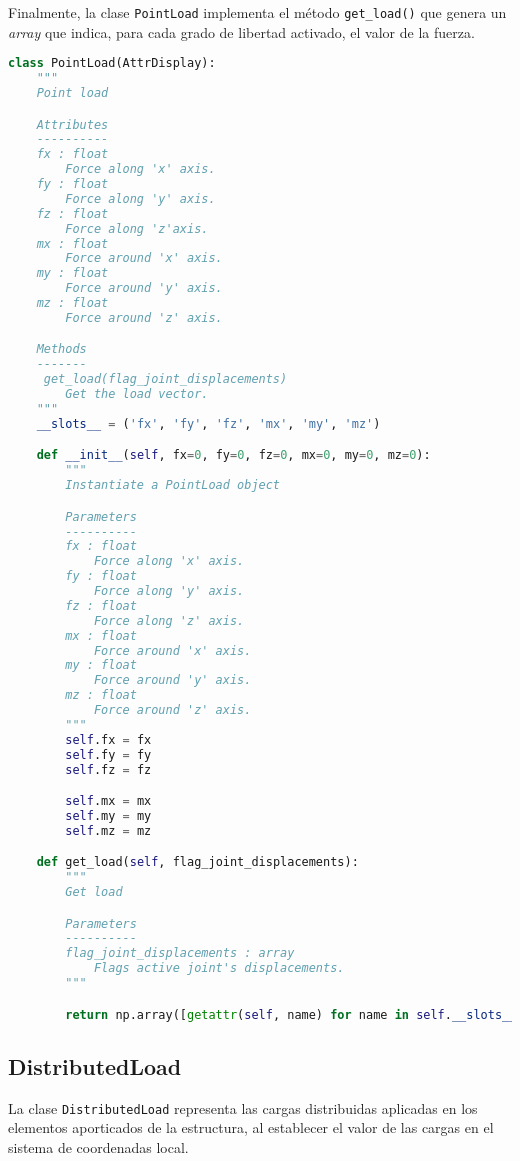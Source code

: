 Finalmente, la clase \verb|PointLoad| implementa el método \verb|get_load()| que genera un \emph{array} que indica, para cada grado de libertad activado, el valor de la fuerza.

\begin{lstlisting}[language=Python,caption=Clase \texttt{PointLoad} implementada en el archivo \texttt{primitives.py}.,label=alg:PointLoad, frame=single]
class PointLoad(AttrDisplay):
    """
    Point load

    Attributes
    ----------
    fx : float
        Force along 'x' axis.
    fy : float
        Force along 'y' axis.
    fz : float
        Force along 'z'axis.
    mx : float
        Force around 'x' axis.
    my : float
        Force around 'y' axis.
    mz : float
        Force around 'z' axis.

    Methods
    -------
     get_load(flag_joint_displacements)
        Get the load vector.
    """
    __slots__ = ('fx', 'fy', 'fz', 'mx', 'my', 'mz')

    def __init__(self, fx=0, fy=0, fz=0, mx=0, my=0, mz=0):
        """
        Instantiate a PointLoad object

        Parameters
        ----------
        fx : float
            Force along 'x' axis.
        fy : float
            Force along 'y' axis.
        fz : float
            Force along 'z' axis.
        mx : float
            Force around 'x' axis.
        my : float
            Force around 'y' axis.
        mz : float
            Force around 'z' axis.
        """
        self.fx = fx
        self.fy = fy
        self.fz = fz

        self.mx = mx
        self.my = my
        self.mz = mz

    def get_load(self, flag_joint_displacements):
        """
        Get load

        Parameters
        ----------
        flag_joint_displacements : array
            Flags active joint's displacements.
        """

        return np.array([getattr(self, name) for name in self.__slots__])[flag_joint_displacements]
\end{lstlisting}

\subsection{DistributedLoad}

La clase \verb|DistributedLoad| representa las cargas distribuidas aplicadas en los elementos aporticados de la estructura, al establecer el valor de las cargas en el sistema de coordenadas local.\\

